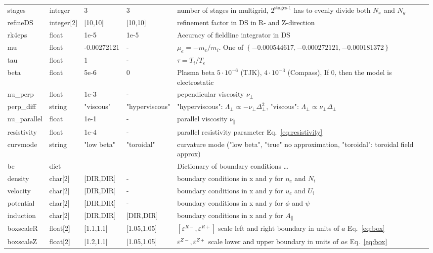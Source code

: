 \begin{longtable}{llll>{\RaggedRight}p{6cm}}
stages      & integer & 3 & 3 & number of stages in multigrid, $2^{\text{stages-1}}$
has to evenly divide both $N_x$ and $N_y$\\
refineDS     & integer[2] & [10,10] & [10,10] & refinement factor in DS in R- and Z-direction\\
rk4eps     & float & 1e-5 & 1e-5 & Accuracy of fieldline integrator in DS\\
mu         & float & -0.00272121& - & $\mu_e =-m_e/m_i$.
    One of $\left\{ -0.000544617, -0.000272121, -0.000181372 \right\}$\\
tau        & float &1      & - & $\tau = T_i/T_e$  \\
beta       & float & 5e-6  & 0 & Plasma beta $5\cdot 10^{-6}$ (TJK), $4\cdot 10^{-3}$ (Compass), If $0$, then the model is electrostatic \\
nu\_perp   & float &1e-3   & - & pependicular viscosity $\nu_\perp$ \\
perp\_diff & string & "viscous" & "hyperviscous" & "hyperviscous": $\Lambda_\perp \propto -\nu_\perp\Delta_\perp^2$, "viscous": $\Lambda_\perp\propto \nu_\perp\Delta_\perp$ \\
nu\_parallel & float &1e-1 & - & parallel viscosity $\nu_\parallel$ \\
resistivity & float &1e-4  & - & parallel resistivity parameter Eq.~\eqref{eq:resistivity}\\
curvmode  & string & "low beta"  & "toroidal"& curvature mode ("low beta", "true" no approximation, "toroidal": toroidal field approx) \\
bc & dict & & & Dictionary of boundary conditions \ldots\\
\qquad density   & char[2] & [DIR,DIR] & -  & boundary conditions in x and y for $n_e$ and $N_i$\\
\qquad velocity  & char[2] & [DIR,DIR] & - & boundary conditions in x and y for $u_e$ and $U_i$\\
\qquad potential & char[2] & [DIR,DIR] & - & boundary conditions in x and y for $\phi$ and $\psi$\\
\qquad induction & char[2] & [DIR,DIR] & [DIR,DIR] & boundary conditions in x and y for $A_\parallel$ \\
    boxscaleR  & float[2] & [1.1,1.1]     & [1.05,1.05] & $[\varepsilon^{R-}, \varepsilon^{R+}]$ scale left and right boundary in units of $a$ Eq.~\eqref{eq:box}\\
    boxscaleZ  & float[2] & [1.2,1.1]     & [1.05,1.05] & $\varepsilon^{Z-}, \varepsilon^{Z+}$ scale lower and upper boundary in units of $ae$ Eq.~\eqref{eq:box} \\

\end{longtable}
